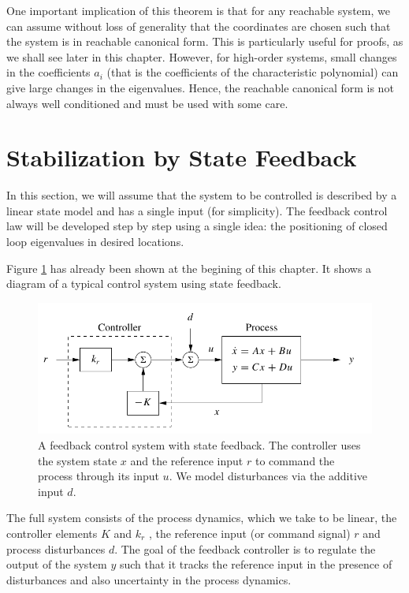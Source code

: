 One important implication of this theorem is that for any reachable system, we
can assume without loss of generality that the coordinates are chosen such that the
system is in reachable canonical form. This is particularly useful for proofs, as we
shall see later in this chapter. However, for high-order systems, small changes in
the coefficients $a_i$ (that is the coefficients of the characteristic polynomial) can give large changes in the eigenvalues. Hence, the reachable canonical form is not always well conditioned and must be used with some care.


\section{Stabilization by State Feedback}

In this section, we will assume that the
system to be controlled is described by a linear state model and has a single input
(for simplicity). The feedback control law will be developed step by step using a
single idea: the positioning of closed loop eigenvalues in desired locations.

Figure \ref{state_feedback_sys_II} has already been shown at the begining of this chapter. It shows a diagram of a typical control system using state feedback.


\begin{figure}[!htb]
\begin{center}
\includegraphics[scale=0.280]{img/state_feedback/state_feedback_sys.jpeg}
\end{center}
\caption{A feedback control system with state feedback. The controller uses the system
state $x$ and the reference input $r$ to command the process through its input $u$. We model
disturbances via the additive input $d$.}
\label{state_feedback_sys_II}
\end{figure}

The full system consists of the process dynamics, which we take to be linear, the controller
elements $K$ and $k_r$ , the reference input (or command signal) $r$ and process disturbances $d$. The goal of the feedback controller is to regulate the output of the system $y$ such that it tracks the reference input in the presence of disturbances and also uncertainty in the process dynamics.

